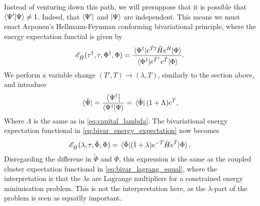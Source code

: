 Instead of venturing down this path, we will presuppose that it is possible
that $\braket{{\Psi}'}{\Psi} \neq 1$. Indeed, that $\bra{{\Psi}'}$ 
and $\ket{\Psi}$ are independent. This means we must enact
Arponen's\cite{arponen1983variational} Hellmann-Feynman conforming bivariational 
principle, where the energy expectation functial is given by 
\begin{equation}
    \label{eq:bivar_energy_expectation}
    \mathscr{E}_{\hat{H}}(\tau^\dagger, \tau, \Phi^\dagger, \Phi)
    = \frac{\mel*{\Phi^\dagger}{e^{\hat{T}\dagger}\hat{H}e^{\hat{H}}}{\Phi}}
    {\mel*{\Phi^\dagger}{e^{\hat{T}^\dagger}e^{\hat{T}}}{\Phi}}.
\end{equation}
We perform a variable change $(T', T)\to(\lambda, T)$, similarly to the section above, 
and introduce
\begin{equation}
    \bra*{\tilde{\Psi}} = \frac{\bra{\Psi^\dagger}}{\braket{\Psi^\dagger}{\Psi}}
    = \bra*{\tilde{\Phi}} (1 + \Lambda) e^{\hat{T}},
\end{equation}
Where $\Lambda$ is the same as in \autoref{eq:capital_lambda}.
The bivariational energy expectation functional in \autoref{eq:bivar_energy_expectation}
now becomes
\begin{equation}
    \mathscr{E}_{\hat{H}}(\lambda, \tau, \tilde{\Phi}, \Phi)
    = \mel*{\tilde{\Phi}}{(\hat{1} + \lambda)e^{-\hat{T}}\hat{H}e^{\hat{T}} }{\Phi}.
\end{equation}
Disregarding the differene in $\tilde{\Phi}$ and $\Phi$, this expression is the 
same as the coupled cluster expectation functional in \autoref{eq:bivar_lagrang_equal},
where the interpretation is that the $\lambda$s are Lagrange multipliers 
for a constrained energy minimisation problem. This is not the interprestation 
here, as the $\lambda$-part of the problem is seen as equatlly important.

